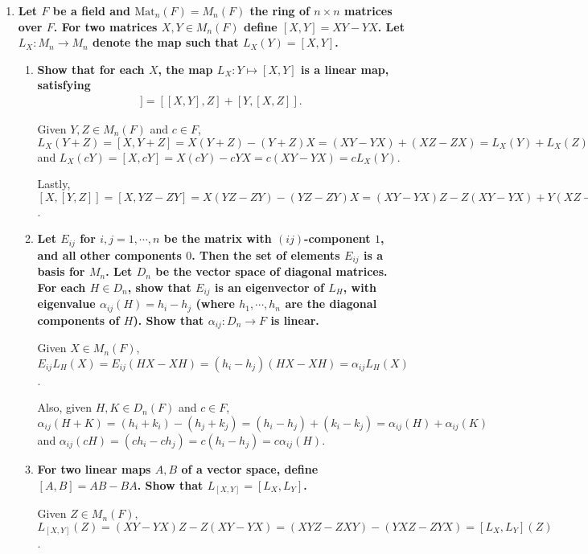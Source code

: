 \documentclass[12pt]{article}
\begin{document}
\begin{enumerate}
    \item[25.]
        \boldmath\textbf{Let $F$ be a field and $\text{Mat}_n(F) = M_n(F)$ the ring of $n \times n$ matrices over $F$. For two matrices $X, Y \in M_n(F)$ define $[X, Y] = XY - YX$. Let $L_X : M_n \to M_n$ denote the map such that $L_X(Y) = [X, Y]$.
        }\unboldmath
        \begin{enumerate}
            \item
                \boldmath\textbf{Show that for each $X$, the map $L_X : Y \mapsto [X, Y]$ is a linear map, satisfying
                    \begin{align*}
                        [X, [Y, Z]] = [[X, Y], Z] + [Y, [X, Z]].
                    \end{align*}
                }\unboldmath \par
                Given $Y, Z \in M_n(F)$ and $c \in F$, $L_X(Y + Z) = [X, Y + Z] = X(Y + Z) - (Y + Z)X = (XY - YX) + (XZ - ZX) = L_X(Y) + L_X(Z)$ and $L_X(cY) = [X, cY] = X(cY) - cYX = c(XY - YX) = cL_X(Y)$. \par
                Lastly, $[X, [Y, Z]] = [X, YZ - ZY] = X(YZ - ZY) - (YZ - ZY)X = (XY - YX)Z - Z(XY - YX) + Y(XZ - ZX) - (XZ - ZX)Y = [XY - YX, Z] + [Y, XZ - ZX] = [[X, Y], Z] + [Y, [X, Z]]$.
            \item
                \boldmath\textbf{Let $E_{ij}$ for $i, j = 1, \cdots, n$ be the matrix with $(ij)$-component $1$, and all other components $0$. Then the set of elements $E_{ij}$ is a basis for $M_n$. Let $D_n$ be the vector space of diagonal matrices. For each $H \in D_n$, show that $E_{ij}$ is an eigenvector of $L_H$, with eigenvalue $\alpha_{ij}(H) = h_i - h_j$ (where $h_1, \cdots, h_n$ are the diagonal components of $H$). Show that $\alpha_{ij} : D_n \to F$ is linear.
                }\unboldmath \par
                Given $X \in M_n(F)$, $E_{ij} L_H(X) = E_{ij} (HX - XH) = (h_i - h_j) (HX - XH) = \alpha_{ij} L_H(X)$. \par
                Also, given $H, K \in D_n(F)$ and $c \in F$, $\alpha_{ij}(H + K) = (h_i + k_i) - (h_j + k_j) =  (h_i - h_j) + (k_i - k_j) = \alpha_{ij}(H) + \alpha_{ij}(K)$ and $\alpha_{ij}(cH) = (ch_i - ch_j) = c(h_i - h_j) = c\alpha_{ij}(H)$.
            \item
                \boldmath\textbf{For two linear maps $A, B$ of a vector space, define $[A, B] = AB - BA$. Show that $L_{[X, Y]} = [L_X, L_Y]$.%
                }\unboldmath \par
                Given $Z \in M_n(F)$, $L_{[X, Y]}(Z) = (XY - YX)Z - Z(XY - YX) = (XYZ - ZXY) - (YXZ - ZYX) = [L_X, L_Y](Z)$.
        \end{enumerate}
\end{enumerate}
\end{document}
